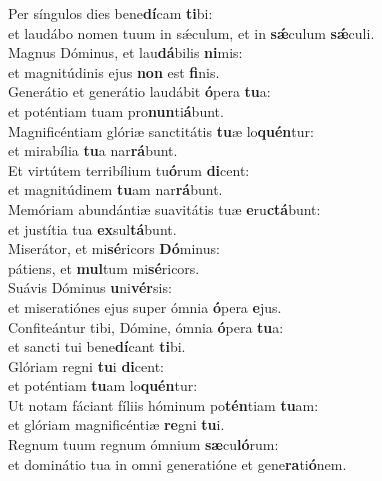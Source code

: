\evenverse Per síngulos dies bene\textbf{dí}cam \textbf{ti}bi:~\*\\
\evenverse et laudábo nomen tuum in sǽculum, et in \textbf{sǽ}culum \textbf{sǽ}culi.\\
\oddverse Magnus Dóminus, et lau\textbf{dá}bilis \textbf{ni}mis:~\*\\
\oddverse et magnitúdinis ejus \textbf{non} est \textbf{fi}nis.\\
\evenverse Generátio et generátio laudábit \textbf{ó}pera \textbf{tu}a:~\*\\
\evenverse et poténtiam tuam pro\textbf{nun}ti\textbf{á}bunt.\\
\oddverse Magnificéntiam glóriæ sanctitátis \textbf{tu}æ lo\textbf{quén}tur:~\*\\
\oddverse et mirabília \textbf{tu}a nar\textbf{rá}bunt.\\
\evenverse Et virtútem terribílium tu\textbf{ó}rum \textbf{di}cent:~\*\\
\evenverse et magnitúdinem \textbf{tu}am nar\textbf{rá}bunt.\\
\oddverse Memóriam abundántiæ suavitátis tuæ \textbf{e}ru\textbf{ctá}bunt:~\*\\
\oddverse et justítia tua \textbf{ex}sul\textbf{tá}bunt.\\
\evenverse Miserátor, et mi\textbf{sé}ricors \textbf{Dó}minus:~\*\\
\evenverse pátiens, et \textbf{mul}tum mi\textbf{sé}ricors.\\
\oddverse Suávis Dóminus \textbf{u}ni\textbf{vér}sis:~\*\\
\oddverse et miseratiónes ejus super ómnia \textbf{ó}pera \textbf{e}jus.\\
\evenverse Confiteántur tibi, Dómine, ómnia \textbf{ó}pera \textbf{tu}a:~\*\\
\evenverse et sancti tui bene\textbf{dí}cant \textbf{ti}bi.\\
\oddverse Glóriam regni \textbf{tu}i \textbf{di}cent:~\*\\
\oddverse et poténtiam \textbf{tu}am lo\textbf{quén}tur:\\
\evenverse Ut notam fáciant fíliis hóminum po\textbf{tén}tiam \textbf{tu}am:~\*\\
\evenverse et glóriam magnificéntiæ \textbf{re}gni \textbf{tu}i.\\
\oddverse Regnum tuum regnum ómnium \textbf{sæ}cu\textbf{ló}rum:~\*\\
\oddverse et dominátio tua in omni generatióne et gene\textbf{ra}ti\textbf{ó}nem.\\
